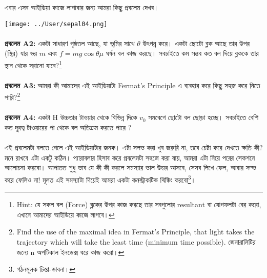 \documentclass[12pt,a4paper]{article}
\begin{document}
এবার এসব আইডিয়া কাজে লাগাবার জন্য আমরা কিছু প্রবলেম দেখব।

\texttt{[image: ../User/sepal04.png]} \\
\\
\textbf{প্রবলেম A2:} একটা সাধারণ পৃষ্ঠতল আছে, যা ভূমির সাথে $\theta$ উৎপন্ন করে। একটা ছোটো ব্লক আছে তার উপর (স্থির) যার ভর $m$ এবং $f = mg \cos \theta  \mu$ ঘর্ষন বল কাজ করছে। সবচাইতে কম সম্ভব কত বল দিয়ে ব্লককে তার স্থান থেকে সরানো যাবে?\footnote{Hint: যে সকল বল (Force) ব্লকের উপর কাজ করছে তার সবগুলোর resultant বা যোগফলটা বের করো, এখানে আমাদের আইডিয়ে কাজে লাগবে।}
\\
\\
\textbf{প্রবলেম A3:} আমরা কী আমাদের এই আইডিয়াটা Fermat's Principle এ ব্যবহার করে কিছু সহজ করে নিতে পারি?\footnote{Find the use of the maximal idea in Fermat's Principle, that light takes the trajectory which will take the least time (minimum time possible). জেনারালিটির জন্যে n অপটিকাল ইনডেক্স ধরে কাজ করো।}\\
\\
\textbf{প্রবলেম A4:} একটা H উচ্চতার টাওয়ার থেকে বিভিন্ন দিকে $v_0$ সমবেগে ছোটো বল ছোড়া হচ্ছে। সবচাইতে বেশি কত দূরত্ব টাওয়ারের পা থেকে বল অতিক্রম করতে পারে ?
\\
\\
এই প্রবলেমটা বলতে গেলে এই আইডিয়াটার জনক। এটা সলভ করা খুব জরুরি না, তবে চেষ্টা করে দেখতে ক্ষতি কী? মনে রাখবে এটা একটু কঠিন। প্যারাবলার হিসাব করে প্রবলেমটা সহজে করা যায়, আমরা এটা নিয়ে পরের সেকশনে আলোচনা করবো। আপাতত শুধু ভাব যে কী কী করলে সমস্যার ভাল উত্তর আসবে, সেসব লিখে ফেল, আবার সল্ভ করে ফেলিও না! মূলত এই সমস্যাটা দিয়েই আমরা একটা কনস্ট্রাকটিভ থিঙ্কিং করবো\footnote{গঠনমূলক চিন্তা-ভাবনা।}। 
\end{document}
